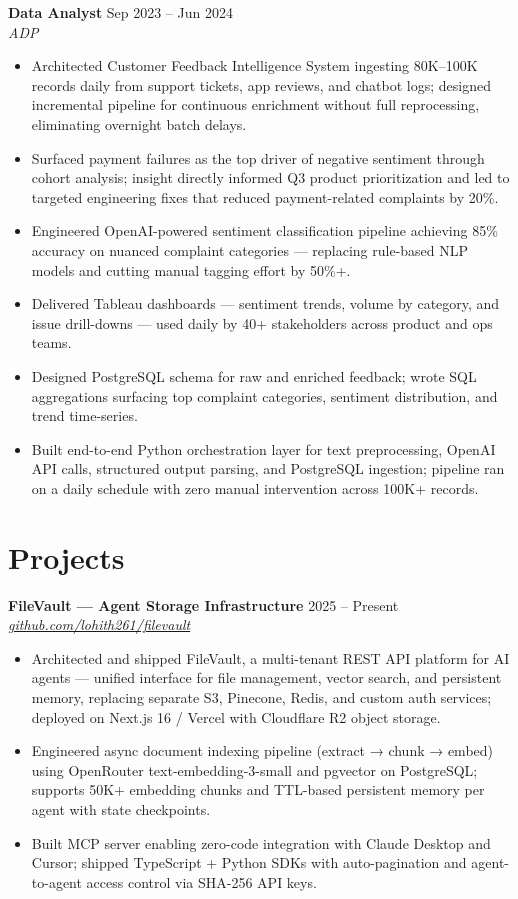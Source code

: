 \documentclass[10pt,letterpaper]{article}
\newcommand{\entry}[3]{%
  \vspace{3pt}\textbf{#1} \hfill #3 \\
  \textit{\small #2}\vspace{1pt}}
\begin{document}
\entry{Data Analyst}{ADP}{Sep 2023 -- Jun 2024}
\begin{itemize}
  \item Architected Customer Feedback Intelligence System ingesting 80K--100K records daily from support tickets, app reviews, and chatbot logs; designed incremental pipeline for continuous enrichment without full reprocessing, eliminating overnight batch delays.
  \item Surfaced payment failures as the top driver of negative sentiment through cohort analysis; insight directly informed Q3 product prioritization and led to targeted engineering fixes that reduced payment-related complaints by 20\%.
  \item Engineered OpenAI-powered sentiment classification pipeline achieving 85\% accuracy on nuanced complaint categories --- replacing rule-based NLP models and cutting manual tagging effort by 50\%+.
  \item Delivered Tableau dashboards --- sentiment trends, volume by category, and issue drill-downs --- used daily by 40+ stakeholders across product and ops teams.
  \item Designed PostgreSQL schema for raw and enriched feedback; wrote SQL aggregations surfacing top complaint categories, sentiment distribution, and trend time-series.
  \item Built end-to-end Python orchestration layer for text preprocessing, OpenAI API calls, structured output parsing, and PostgreSQL ingestion; pipeline ran on a daily schedule with zero manual intervention across 100K+ records.
\end{itemize}

\section{Projects}

\entry{FileVault --- Agent Storage Infrastructure}{\href{https://github.com/lohith261/filevault}{github.com/lohith261/filevault}}{2025 -- Present}
\begin{itemize}
  \item Architected and shipped FileVault, a multi-tenant REST API platform for AI agents --- unified interface for file management, vector search, and persistent memory, replacing separate S3, Pinecone, Redis, and custom auth services; deployed on Next.js 16 / Vercel with Cloudflare R2 object storage.
  \item Engineered async document indexing pipeline (extract → chunk → embed) using OpenRouter text-embedding-3-small and pgvector on PostgreSQL; supports 50K+ embedding chunks and TTL-based persistent memory per agent with state checkpoints.
  \item Built MCP server enabling zero-code integration with Claude Desktop and Cursor; shipped TypeScript + Python SDKs with auto-pagination and agent-to-agent access control via SHA-256 API keys.
\end{itemize}
\end{document}
